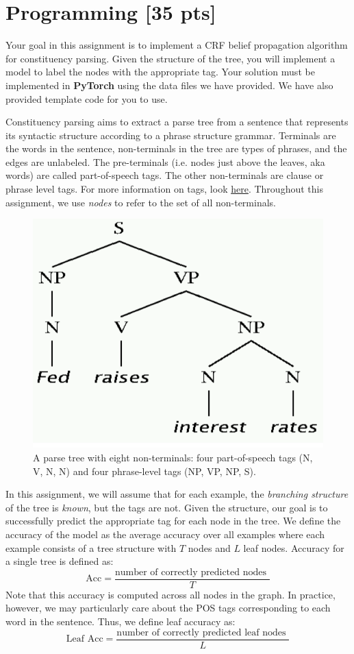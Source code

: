 \documentclass[11pt,addpoints,answers]{exam}
\numberwithin{equation}{section} %
\numberwithin{figure}{section} %
\numberwithin{table}{section} %
\newcommand{\pts}[1]{\textbf{[#1 pts]}}
\begin{document}
\section{Programming \pts{35}}
\label{sec:code}

Your goal in this assignment is to implement a CRF belief propagation algorithm for  constituency parsing. Given the structure of the tree, you will implement a model to label the nodes with the appropriate tag. Your solution must be implemented in \textbf{PyTorch} using the data files we have provided. We have also provided template code for you to use.


Constituency parsing aims to extract a parse tree from a sentence that represents its syntactic structure according to a phrase structure grammar. Terminals are the words in the sentence, non-terminals in the tree are types of phrases, and the edges are unlabeled. The pre-terminals (i.e. nodes just above the leaves, aka words) are called part-of-speech tags. The other non-terminals are clause or phrase level tags. For more information on tags, look \href{http://www.surdeanu.info/mihai/teaching/ista555-fall13/readings/PennTreebankConstituents.html}{here}. Throughout this assignment, we use \textit{nodes} to refer to the set of all non-terminals.

\begin{figure}[h]
\centering
\includegraphics[width=0.50\linewidth]{fig/parsetree.png}
\caption{A parse tree with eight non-terminals: four part-of-speech tags (N, V, N, N) and four phrase-level tags (NP, VP, NP, S).}
\label{overflow}
\end{figure}

In this assignment, we will assume that for each example, the \emph{branching structure} of the tree is \emph{known}, but the tags are not. Given the structure, our goal is to successfully predict the appropriate tag for each node in the tree. We define the accuracy of the model as the average accuracy over all examples where each example consists of a tree structure with $T$ nodes and $L$ leaf nodes. Accuracy for a single tree is defined as:
$$ \text{Acc} = \frac{\text{number of correctly predicted nodes }}{ T}$$
Note that this accuracy is computed across all nodes in the graph. In practice, however, we may particularly care about the POS tags corresponding to each word in the sentence. Thus, we define leaf accuracy as:
$$ \text{Leaf Acc} = \frac{\text{number of correctly predicted leaf nodes }}{L}$$
\end{document}
